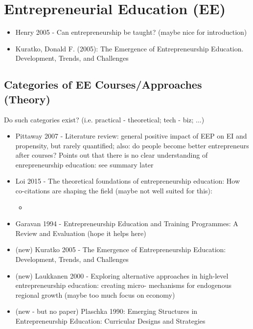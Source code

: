 \section{Entrepreneurial Education (EE)}
\label{sec:EE}

\begin{itemize}
\item Henry 2005 - Can entrepreneurship be taught? (maybe nice for introduction)
\item  Kuratko, Donald F. (2005): The Emergence of Entrepreneurship Education. Development, Trends, and Challenges 
\end{itemize}

\subsection{Categories of EE Courses/Approaches (Theory)}
Do such categories exist? (i.e. practical - theoretical; tech - biz; ...)
\begin{itemize}
\item Pittaway 2007 - Literature review: general positive impact of EEP on EI and propensity, but rarely quantified; also: do people become better entrepreneurs after courses? Points out that there is no clear understanding of enrepreneurship education:
see summary later
\item Loi 2015 - The theoretical foundations of entrepreneurship education: How co-citations are shaping the field (maybe not well suited for this):
\begin{itemize}
\item 
\end{itemize}
\item Garavan 1994 - Entrepreneurship Education and Training Programmes: A Review and Evaluation (hope it helps here)
\item (new) Kuratko 2005 - The Emergence of Entrepreneurship Education: Development, Trends, and Challenges
\item (new) Laukkanen 2000 - Exploring alternative approaches in high-level entrepreneurship education: creating micro- mechanisms for endogenous regional growth (maybe too much focus on economy)
\item (new - but no paper) Plaschka 1990: Emerging Structures in Entrepreneurship Education: Curricular Designs and Strategies
\end{itemize}

